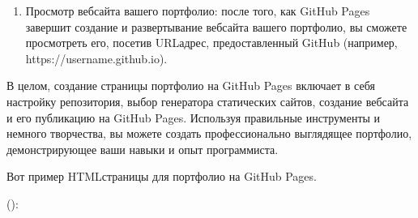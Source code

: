 \documentclass[letterpaper,10pt,russian]{sphinxmanual}
\begin{document}
\begin{enumerate}
\item {} 
\sphinxAtStartPar
Просмотр веб\sphinxhyphen{}сайта вашего портфолио: после того, как GitHub Pages завершит создание и развертывание веб\sphinxhyphen{}сайта вашего портфолио, вы сможете просмотреть его, посетив URL\sphinxhyphen{}адрес, предоставленный GitHub (например, https://username.github.io).

\end{enumerate}

\sphinxAtStartPar
В целом, создание страницы портфолио на GitHub Pages включает в себя настройку репозитория, выбор генератора статических сайтов, создание веб\sphinxhyphen{}сайта и его публикацию на GitHub Pages. Используя правильные инструменты и немного творчества, вы можете создать профессионально выглядящее портфолио, демонстрирующее ваши навыки и опыт программиста.

\sphinxAtStartPar
Вот пример HTML\sphinxhyphen{}страницы для портфолио на GitHub Pages.

\sphinxAtStartPar
():
\end{document}
